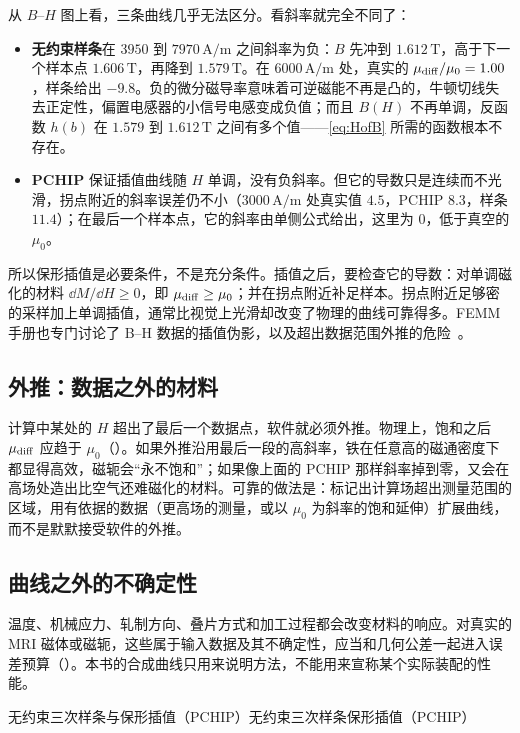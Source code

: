从 $B$--$H$ 图上看，三条曲线几乎无法区分。看斜率就完全不同了：
\begin{itemize}
\item \textbf{无约束样条}在 $3950$ 到 $7970\,\mathrm{A/m}$ 之间斜率为负：$B$ 先冲到 $1.612\,\mathrm T$，高于下一个样本点 $1.606\,\mathrm T$，再降到 $1.579\,\mathrm T$。在 $6000\,\mathrm{A/m}$ 处，真实的 $\mu_{\rm diff}/\mu_0=1.00$，样条给出 $-9.8$。负的微分磁导率意味着可逆磁能不再是凸的，牛顿切线失去正定性，偏置电感器的小信号电感变成负值；而且 $B(H)$ 不再单调，反函数 $h(b)$ 在 $1.579$ 到 $1.612\,\mathrm T$ 之间有多个值——\eqref{eq:HofB} 所需的函数根本不存在。
\item \textbf{PCHIP} 保证插值曲线随 $H$ 单调，没有负斜率。但它的导数只是连续而不光滑，拐点附近的斜率误差仍不小（$3000\,\mathrm{A/m}$ 处真实值 $4.5$，PCHIP $8.3$，样条 $11.4$）；在最后一个样本点，它的斜率由单侧公式给出，这里为 $0$，低于真空的 $\mu_0$。
\end{itemize}
所以保形插值是必要条件，不是充分条件。插值之后，要检查它的导数：对单调磁化的材料 $\dd M/\dd H\ge0$，即 $\mu_{\rm diff}\ge\mu_0$；并在拐点附近补足样本。拐点附近足够密的采样加上单调插值，通常比视觉上光滑却改变了物理的曲线可靠得多。FEMM 手册也专门讨论了 B--H 数据的插值伪影，以及超出数据范围外推的危险~\cite{femm}。

\subsection{外推：数据之外的材料}
计算中某处的 $H$ 超出了最后一个数据点，软件就必须外推。物理上，饱和之后 $\mu_{\rm diff}$ 应趋于 $\mu_0$（）。如果外推沿用最后一段的高斜率，铁在任意高的磁通密度下都显得高效，磁轭会“永不饱和”；如果像上面的 PCHIP 那样斜率掉到零，又会在高场处造出比空气还难磁化的材料。可靠的做法是：标记出计算场超出测量范围的区域，用有依据的数据（更高场的测量，或以 $\mu_0$ 为斜率的饱和延伸）扩展曲线，而不是默默接受软件的外推。

\subsection{曲线之外的不确定性}
温度、机械应力、轧制方向、叠片方式和加工过程都会改变材料的响应。对真实的 MRI 磁体或磁轭，这些属于输入数据及其不确定性，应当和几何公差一起进入误差预算（）。本书的合成曲线只用来说明方法，不能用来宣称某个实际装配的性能。

\begin{compare}{无约束三次样条与保形插值（PCHIP）}{无约束三次样条}{保形插值（PCHIP）}
\end{compare}

